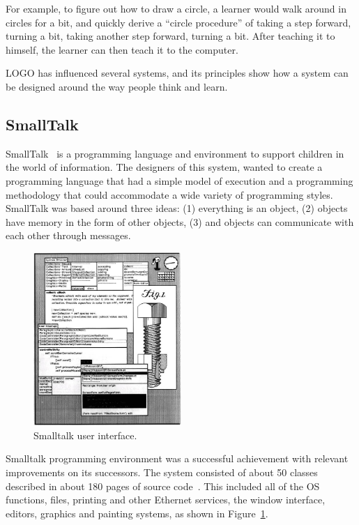 For example, to figure out how to draw a circle, a learner would walk around in circles for a bit, and quickly derive a ``circle procedure'' of taking a step forward, turning a bit, taking another step forward, turning a bit. After teaching it to himself, the learner can then teach it to the computer. 

LOGO has influenced several systems, and its principles show how a system can be designed around the way people think and learn.
\subsection{SmallTalk}
\label{subsec:smalltalk}
SmallTalk~\cite{Kay1993} is a programming language and environment to support children in the world of information. The designers of this system, wanted to create a programming language that had a simple model of execution and a programming methodology that could accommodate a wide variety of programming styles. SmallTalk was based around three ideas: (1) everything is an object, (2) objects have memory in the form of other objects, (3) and objects can communicate with each other through messages.

\begin{figure}
  \centering
  \includegraphics[width=0.5\textwidth]{images/smalltalk}
    \caption{Smalltalk user interface.}
  \label{fig:smalltalk}
\end{figure} 

Smalltalk programming environment was a successful achievement with relevant improvements on its successors. The system consisted of about 50 classes described in about 180 pages of source code~\cite{Kay1993}. This included all of the OS functions, files, printing and other Ethernet services, the window interface, editors, graphics and painting systems, as shown in Figure~\ref{fig:smalltalk}. 

